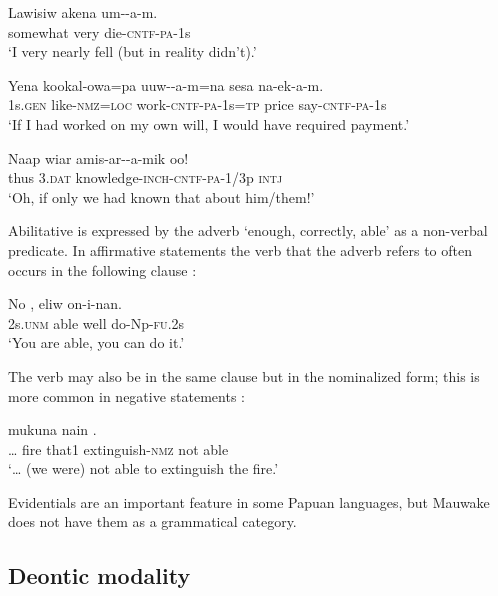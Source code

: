 \ea%
\label{ex:6:x1054}
\gll Lawisiw  akena  um--a-m. \\
somewhat  very  die-\textsc{cntf}-\textsc{pa}-1s\\
\glt `I very nearly fell (but in reality didn't).'
\z

\ea%
\label{ex:6:x1055}
\gll Yena  kookal-owa=pa  uuw--a-m=na  sesa  na-ek-a-m. \\
1s.\textsc{gen}  like-\textsc{nmz}=\textsc{loc}  work-\textsc{cntf}-\textsc{pa}-1s=\textsc{tp}  price  say-\textsc{cntf}-\textsc{pa}-1s\\
\glt `If I had worked on my own will, I would have required payment.'
\z

\ea%
\label{ex:6:x1056}
\gll Naap  wiar  amis-ar--a-mik  oo! \\
thus  3.\textsc{dat}  knowledge-\textsc{inch}-\textsc{cntf}-\textsc{pa}-1/3p  \textsc{intj}\\
\glt `Oh, if only we had known that about him/them!'
\z

Abilitative is expressed by the adverb  `enough, correctly, able' as a non-verbal predicate. In affirmative statements the verb that the adverb refers to often occurs in the following clause :

\ea%
\label{ex:6:x1089}
\gll No  ,  eliw  on-i-nan. \\
2s.\textsc{unm}  able  well  do-Np-\textsc{fu}.2s\\
\glt `You are able, you can do it.'
\z

The verb may also be in the same clause but in the nominalized form; this is more common in negative statements :

\ea%
\label{ex:6:x1088}
\gll {\dots} mukuna  nain    . \\
{\dots} fire that1  extinguish-\textsc{nmz} not  able\\
\glt `{\dots} (we were) not able to extinguish the fire.'
\z

Evidentials are an important feature in some Papuan languages, but Mauwake does not have them as a grammatical category.

\subsection{Deontic modality} \label{sec:6.1.2}

